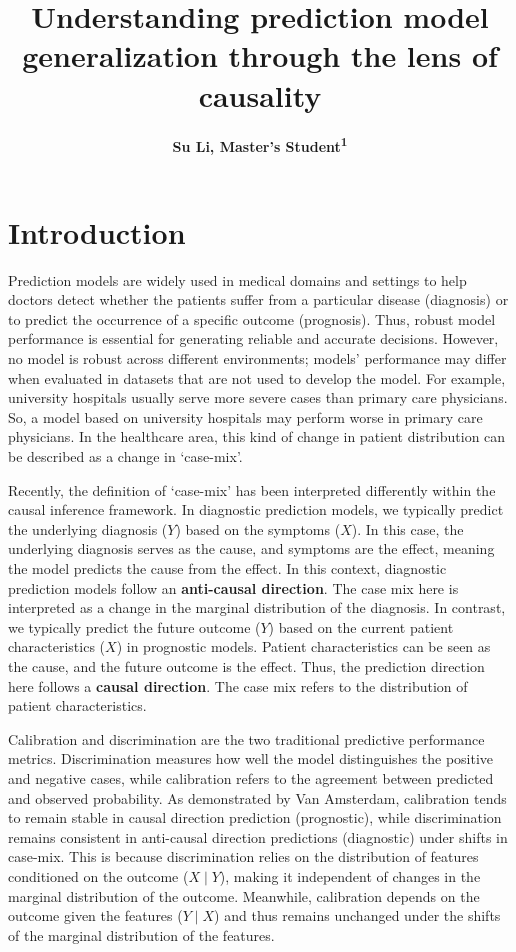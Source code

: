 \documentclass[10.7pt,]{article}
\title{\vspace{-2em} Understanding prediction model generalization through the lens of causality}
\author[ ]{\bf\fontsize{13}{14}\selectfont Su Li, Master's Student\textsuperscript{1}\vspace{-.7em}}
\affil[1]{\bf\fontsize{13}{14}\selectfont Faculty of Social and Behavioural Sciences, Utrecht University, Netherlands}
\date{}
\begin{document}
\maketitle
\vspace{-4em} %



\section{Introduction}\label{introduction}
Prediction models are widely used in medical domains and settings to help doctors detect whether the patients suffer from a particular disease (diagnosis) or to predict the occurrence of a specific outcome (prognosis).\cite{1,2} Thus, robust model performance is essential for generating reliable and accurate decisions. However, no model is robust across different environments; models’ performance may differ when evaluated in datasets that are not used to develop the model.\cite{3} For example, university hospitals usually serve more severe cases than primary care physicians. So, a model based on university hospitals may perform worse in primary care physicians. In the healthcare area, this kind of change in patient distribution can be described as a change in ‘case-mix’.\cite{4}  

Recently, the definition of ‘case-mix’ has been interpreted differently within the causal inference framework. In diagnostic prediction models, we typically predict the underlying diagnosis (\(Y\)) based on the symptoms (\(X\)). In this case, the underlying diagnosis serves as the cause, and symptoms are the effect, meaning the model predicts the cause from the effect. In this context, diagnostic prediction models follow an \textbf{anti-causal direction}. The case mix here is interpreted as a change in the marginal distribution of the diagnosis. In contrast, we typically predict the future outcome (\(Y\)) based on the current patient characteristics (\(X\)) in prognostic models. Patient characteristics can be seen as the cause, and the future outcome is the effect. Thus, the prediction direction here follows a \textbf{causal direction}. The case mix refers to the distribution of patient characteristics.

  
Calibration and discrimination are the two traditional predictive performance metrics.\cite{3} Discrimination measures how well the model distinguishes the positive and negative cases, while calibration refers to the agreement between predicted and observed probability.\cite{5} As demonstrated by Van Amsterdam,\cite{6} calibration tends to remain stable in causal direction prediction (prognostic), while discrimination remains consistent in anti-causal direction predictions (diagnostic) under shifts in case-mix. This is because discrimination relies on the distribution of features conditioned on the outcome (\(X \mid Y\)), making it independent of changes in the marginal distribution of the outcome. Meanwhile, calibration depends on the outcome given the features (\(Y \mid X\)) and thus remains unchanged under the shifts of the marginal distribution of the features.
\end{document}
